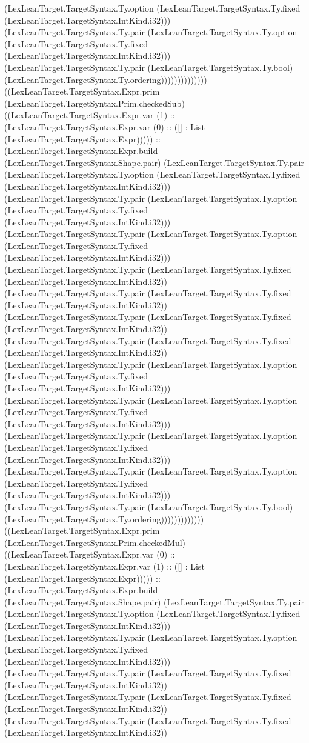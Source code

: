 \documentclass[11pt]{article}
\begin{document}
(LexLeanTarget.TargetSyntax.Ty.option (LexLeanTarget.TargetSyntax.Ty.fixed (LexLeanTarget.TargetSyntax.IntKind.i32))) (LexLeanTarget.TargetSyntax.Ty.pair (LexLeanTarget.TargetSyntax.Ty.option (LexLeanTarget.TargetSyntax.Ty.fixed (LexLeanTarget.TargetSyntax.IntKind.i32))) (LexLeanTarget.TargetSyntax.Ty.pair (LexLeanTarget.TargetSyntax.Ty.bool) (LexLeanTarget.TargetSyntax.Ty.ordering)))))))))))))) ((LexLeanTarget.TargetSyntax.Expr.prim (LexLeanTarget.TargetSyntax.Prim.checkedSub) ((LexLeanTarget.TargetSyntax.Expr.var (1) :: (LexLeanTarget.TargetSyntax.Expr.var (0) :: ([] : List (LexLeanTarget.TargetSyntax.Expr))))) :: (LexLeanTarget.TargetSyntax.Expr.build (LexLeanTarget.TargetSyntax.Shape.pair) (LexLeanTarget.TargetSyntax.Ty.pair (LexLeanTarget.TargetSyntax.Ty.option (LexLeanTarget.TargetSyntax.Ty.fixed (LexLeanTarget.TargetSyntax.IntKind.i32))) (LexLeanTarget.TargetSyntax.Ty.pair (LexLeanTarget.TargetSyntax.Ty.option (LexLeanTarget.TargetSyntax.Ty.fixed (LexLeanTarget.TargetSyntax.IntKind.i32))) (LexLeanTarget.TargetSyntax.Ty.pair (LexLeanTarget.TargetSyntax.Ty.option (LexLeanTarget.TargetSyntax.Ty.fixed (LexLeanTarget.TargetSyntax.IntKind.i32))) (LexLeanTarget.TargetSyntax.Ty.pair (LexLeanTarget.TargetSyntax.Ty.fixed (LexLeanTarget.TargetSyntax.IntKind.i32)) (LexLeanTarget.TargetSyntax.Ty.pair (LexLeanTarget.TargetSyntax.Ty.fixed (LexLeanTarget.TargetSyntax.IntKind.i32)) (LexLeanTarget.TargetSyntax.Ty.pair (LexLeanTarget.TargetSyntax.Ty.fixed (LexLeanTarget.TargetSyntax.IntKind.i32)) (LexLeanTarget.TargetSyntax.Ty.pair (LexLeanTarget.TargetSyntax.Ty.fixed (LexLeanTarget.TargetSyntax.IntKind.i32)) (LexLeanTarget.TargetSyntax.Ty.pair (LexLeanTarget.TargetSyntax.Ty.option (LexLeanTarget.TargetSyntax.Ty.fixed (LexLeanTarget.TargetSyntax.IntKind.i32))) (LexLeanTarget.TargetSyntax.Ty.pair (LexLeanTarget.TargetSyntax.Ty.option (LexLeanTarget.TargetSyntax.Ty.fixed (LexLeanTarget.TargetSyntax.IntKind.i32))) (LexLeanTarget.TargetSyntax.Ty.pair (LexLeanTarget.TargetSyntax.Ty.option (LexLeanTarget.TargetSyntax.Ty.fixed (LexLeanTarget.TargetSyntax.IntKind.i32))) (LexLeanTarget.TargetSyntax.Ty.pair (LexLeanTarget.TargetSyntax.Ty.option (LexLeanTarget.TargetSyntax.Ty.fixed (LexLeanTarget.TargetSyntax.IntKind.i32))) (LexLeanTarget.TargetSyntax.Ty.pair (LexLeanTarget.TargetSyntax.Ty.bool) (LexLeanTarget.TargetSyntax.Ty.ordering))))))))))))) ((LexLeanTarget.TargetSyntax.Expr.prim (LexLeanTarget.TargetSyntax.Prim.checkedMul) ((LexLeanTarget.TargetSyntax.Expr.var (0) :: (LexLeanTarget.TargetSyntax.Expr.var (1) :: ([] : List (LexLeanTarget.TargetSyntax.Expr))))) :: (LexLeanTarget.TargetSyntax.Expr.build (LexLeanTarget.TargetSyntax.Shape.pair) (LexLeanTarget.TargetSyntax.Ty.pair (LexLeanTarget.TargetSyntax.Ty.option (LexLeanTarget.TargetSyntax.Ty.fixed (LexLeanTarget.TargetSyntax.IntKind.i32))) (LexLeanTarget.TargetSyntax.Ty.pair (LexLeanTarget.TargetSyntax.Ty.option (LexLeanTarget.TargetSyntax.Ty.fixed (LexLeanTarget.TargetSyntax.IntKind.i32))) (LexLeanTarget.TargetSyntax.Ty.pair (LexLeanTarget.TargetSyntax.Ty.fixed (LexLeanTarget.TargetSyntax.IntKind.i32)) (LexLeanTarget.TargetSyntax.Ty.pair (LexLeanTarget.TargetSyntax.Ty.fixed (LexLeanTarget.TargetSyntax.IntKind.i32)) (LexLeanTarget.TargetSyntax.Ty.pair (LexLeanTarget.TargetSyntax.Ty.fixed (LexLeanTarget.TargetSyntax.IntKind.i32)) 
\end{document}
